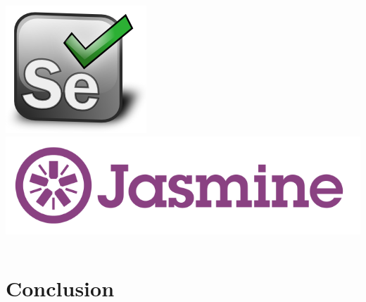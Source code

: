 \begin{frame}
\begin{columns}
    \begin{column}{0.2\textwidth}
      \includegraphics[width=.9\textwidth]{images/selenium.png}\\
      \vspace*{2cm}
      \includegraphics[width=\textwidth]{images/jasmine.png}
    \end{column}
  \end{columns}
\end{frame}

\section{Conclusion}

